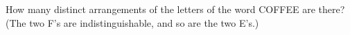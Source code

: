 How many distinct arrangements of the letters of the word COFFEE are there? (The two F's are indistinguishable, and so are the two E's.)
